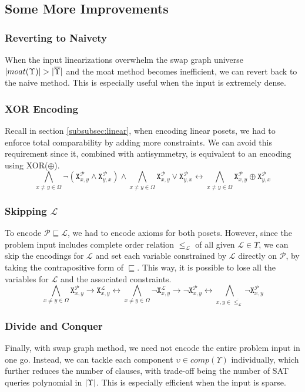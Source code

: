 \documentclass{llncs}
\DeclarePairedDelimiter{\abs}{\lvert}{\rvert}
\let\oldleq\leq
\renewcommand{\leq}[1][]{\oldleq_{#1}}
\renewcommand{\implies}{\rightarrow}
\newcommand{\bicond}{\leftrightarrow}
\newcommand{\poset}[1]{\mathcal{#1}}
\newcommand{\uni}[1][]{\Omega_{#1}}
\newcommand{\lext}{\sqsubseteq}
\newcommand{\complmt}[1]{\overline{#1}}
\newcommand{\satvar}[2]{\mathtt{X}_{#1}^{#2}}
\begin{document}
\subsection{Some More Improvements}
\subsubsection{Reverting to Naivety}
When the input linearizations overwhelm the swap graph universe $\abs{moat(\Upsilon)} > \abs{\complmt{\Upsilon}}$ and the moat method becomes inefficient, we can revert back to the naive method. This is especially useful when the input is extremely dense.

\subsubsection{XOR Encoding}
Recall in section \ref{subsubsec:linear}, when encoding linear posets, we had to enforce total comparability by adding more constraints. We can avoid this requirement since it, combined with antisymmetry, is equivalent to an encoding using XOR($\oplus$).
\[
\bigwedge_{x \neq y \in \uni} \neg (\satvar{x,y}{\poset{P}} \wedge \satvar{y,x}{\poset{P}})
\wedge
\bigwedge_{x \neq y \in \uni} \satvar{x,y}{\poset{P}} \vee \satvar{y,x}{\poset{P}}
\bicond
\bigwedge_{x \neq y \in \uni} \satvar{x,y}{\poset{P}} \oplus \satvar{y,x}{\poset{P}}
\]

\subsubsection{Skipping $\poset{L}$}
To encode $\poset{P} \lext \poset{L}$, we had to encode axioms for both posets. However, since the problem input includes complete order relation $\leq[\poset{L}]$ of all given $\poset{L} \!\in\! \Upsilon$, we can skip the encodings for $\poset{L}$ and set each variable constrained by $\poset{L}$ directly on $\poset{P}$, by taking the contrapositive form of $\lext$. This way, it is possible to lose all the variables for $\poset{L}$ and the associated constraints.
\[
\bigwedge_{x \neq y \in \uni} \satvar{x,y}{\poset{P}} \implies \satvar{x,y}{\poset{L}}
\bicond
\bigwedge_{x \neq y \in \uni} \neg \satvar{x,y}{\poset{L}} \implies \neg \satvar{x,y}{\poset{P}}
\bicond
\bigwedge_{x,y \in \complmt{\leq[\poset{L}]}} \neg \satvar{x,y}{\poset{P}}
\]

\subsubsection{Divide and Conquer}
Finally, with swap graph method, we need not encode the entire problem input in one go. Instead, we can tackle each component $\upsilon \!\in\! comp(\Upsilon)$ individually, which further reduces the number of clauses, with trade-off being the number of SAT queries polynomial in $\abs{\Upsilon}$. This is especially efficient when the input is sparse.
\end{document}
